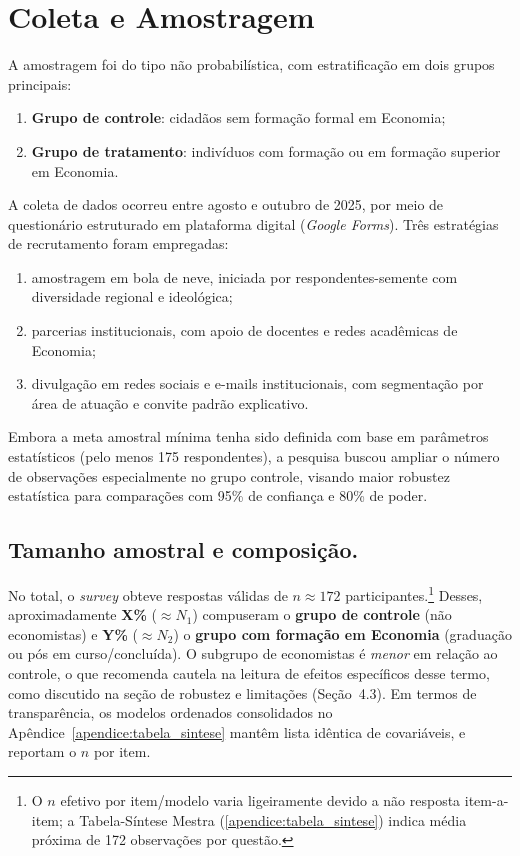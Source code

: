 \section{Coleta e Amostragem}\label{sec:coleta-amostragem}

A amostragem foi do tipo não probabilística, com estratificação em dois grupos principais:
\begin{enumerate}[label=\alph*)]
    \item \textbf{Grupo de controle}: cidadãos sem formação formal em Economia;
    \item \textbf{Grupo de tratamento}: indivíduos com formação ou em formação superior em Economia.
\end{enumerate}

A coleta de dados ocorreu entre agosto e outubro de 2025, por meio de questionário estruturado em plataforma digital (\textit{Google Forms}). Três estratégias de recrutamento foram empregadas:
\begin{enumerate}[label=\alph*)]
    \item amostragem em bola de neve, iniciada por respondentes-semente com diversidade regional e ideológica;
    \item parcerias institucionais, com apoio de docentes e redes acadêmicas de Economia;
    \item divulgação em redes sociais e e-mails institucionais, com segmentação por área de atuação e convite padrão explicativo.
\end{enumerate}

Embora a meta amostral mínima tenha sido definida com base em parâmetros estatísticos (pelo menos 175 respondentes), a pesquisa buscou ampliar o número de observações especialmente no grupo controle, visando maior robustez estatística para comparações com 95\% de confiança e 80\% de poder.

\subsection{Tamanho amostral e composição.}
No total, o \textit{survey} obteve respostas válidas de \textbf{\(n \approx 172\)} participantes.\footnote{O \(n\) efetivo por item/modelo varia ligeiramente devido a não resposta item-a-item; a Tabela-Síntese Mestra (\autoref{apendice:tabela_sintese}) indica média próxima de 172 observações por questão.} Desses, aproximadamente \textbf{X\%} (\(\approx N_1\)) compuseram o \textbf{grupo de controle} (não economistas) e \textbf{Y\%} (\(\approx N_2\)) o \textbf{grupo com formação em Economia} (graduação ou pós em curso/concluída). O subgrupo de economistas é \textit{menor} em relação ao controle, o que recomenda cautela na leitura de efeitos específicos desse termo, como discutido na seção de robustez e limitações (Seção~4.3). Em termos de transparência, os modelos ordenados consolidados no Apêndice~\ref{apendice:tabela_sintese} mantêm lista idêntica de covariáveis, e reportam o \(n\) por item.

